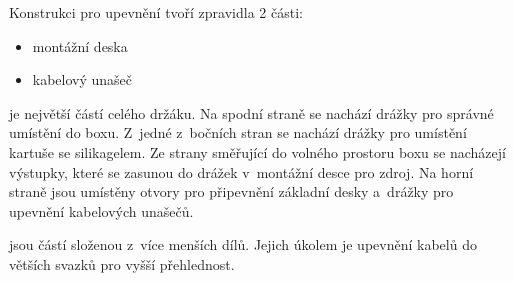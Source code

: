 Konstrukci pro upevnění tvoří zpravidla 2 části:
\begin{itemize}
    \item montážní deska
    \item kabelový unašeč
\end{itemize}

\noindent{} je největší částí celého držáku. 
Na spodní straně se nachází drážky pro správné umístění do boxu.
Z~jedné z~bočních stran se nachází drážky pro umístění kartuše se silikagelem.
Ze strany směřující do volného prostoru boxu se nacházejí výstupky, které se zasunou do drážek v~montážní desce pro zdroj.
Na horní straně jsou umístěny otvory pro připevnění základní desky a~drážky pro upevnění kabelových unašečů.
\newline

\noindent{} jsou částí složenou z~více menších dílů.
Jejich úkolem je upevnění kabelů do větších svazků pro vyšší přehlednost.


\newpage